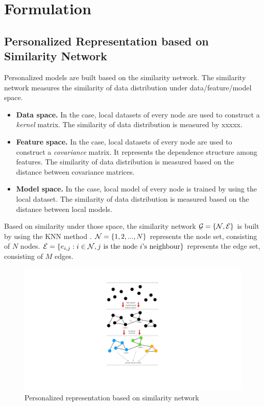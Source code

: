 \documentclass[journal]{IEEEtran}
\begin{document}
\section{Formulation}

\subsection{Personalized Representation based on Similarity Network}

Personalized models are built based on the similarity network. The similarity network measures the similarity of data distribution under data/feature/model space.  
\begin{itemize}
\item \textbf{Data space.} In the case, local datasets of every node are used to construct a \textit{kernel} matrix. The similarity of data distribution is measured by xxxxx.
\item \textbf{Feature space.} In the case, local datasets of every node are used to construct a \textit{covariance} matrix. It represents the dependence structure among features. The similarity of data distribution is measured based on the distance between covariance matrices.
\item \textbf{Model space.} In the case, local model of every node is trained by using the local dataset. The similarity of data distribution is measured based on the distance between local models.
\end{itemize}

Based on similarity under those space, the similarity network ${\mathcal{G}} = \{{\mathcal{N}}, {\mathcal{E}}\}$ is built by using the KNN method \cite{dd}. ${\mathcal{N}}=\{1,2, ..., N\}$ represents the node set, consisting of $N$ nodes. ${\mathcal{E}}=\{e_{i,j} : i\in{\mathcal{N}}, j {~} \text{is the node $i$'s neighbour}\}$ represents the edge set, consisting of $M$ edges. 

\begin{figure}[!t]
\setlength{\abovecaptionskip}{0pt}
\setlength{\belowcaptionskip}{0pt}
\centering 
\includegraphics[width=0.97\columnwidth]{figs/figs_networkG}
\caption{Personalized representation based on similarity network}
\label{figure_xxx}
\end{figure}
\end{document}
